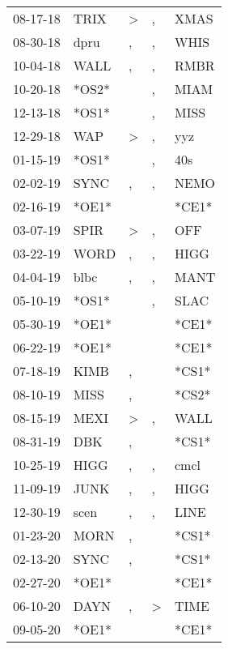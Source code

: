 \begin{supertabular}{lllll}
 08-17-18 &   TRIX &     \textgreater &             , &   XMAS \\
 08-30-18 &   dpru &                , &             , &   WHIS \\
 10-04-18 &   WALL &                , &             , &   RMBR \\
 10-20-18 &  *OS2* &                  &             , &   MIAM \\
 12-13-18 &  *OS1* &                  &             , &   MISS \\
 12-29-18 &    WAP &     \textgreater &             , &    yyz \\
 01-15-19 &  *OS1* &                  &             , &    40s \\
 02-02-19 &   SYNC &                , &             , &   NEMO \\
 02-16-19 &  *OE1* &                  &               &  *CE1* \\
 03-07-19 &   SPIR &     \textgreater &             , &    OFF \\
 03-22-19 &   WORD &                , &             , &   HIGG \\
 04-04-19 &   blbc &                , &             , &   MANT \\
 05-10-19 &  *OS1* &                  &             , &   SLAC \\
 05-30-19 &  *OE1* &                  &               &  *CE1* \\
 06-22-19 &  *OE1* &                  &               &  *CE1* \\
 07-18-19 &   KIMB &                , &               &  *CS1* \\
 08-10-19 &   MISS &                , &               &  *CS2* \\
 08-15-19 &   MEXI &     \textgreater &             , &   WALL \\
 08-31-19 &    DBK &                , &               &  *CS1* \\
 10-25-19 &   HIGG &                , &             , &   cmcl \\
 11-09-19 &   JUNK &                , &             , &   HIGG \\
 12-30-19 &   scen &                , &             , &   LINE \\
 01-23-20 &   MORN &                , &               &  *CS1* \\
 02-13-20 &   SYNC &                , &               &  *CS1* \\
 02-27-20 &  *OE1* &                  &               &  *CE1* \\
 06-10-20 &   DAYN &                , &  \textgreater &   TIME \\
 09-05-20 &  *OE1* &                  &               &  *CE1* \\
\end{supertabular}
